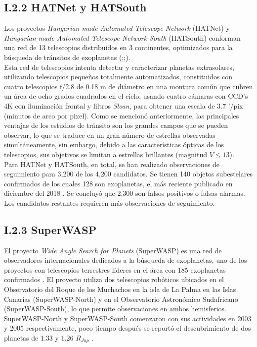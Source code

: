 \subsection*{I.2.2 HATNet y HATSouth}

Los proyectos \textit{Hungarian-made Automated Telescope Network} (HATNet) y \textit{Hungarian-made Automated Telescope Network-South} (HATSouth) conforman una red de 13 telescopios distribuidos en 3 continentes, optimizados para la búsqueda de tránsitos de exoplanetas (\citep{bakos2002system};\cite{bakos2004wide};\cite{bakos2013hatsouth}).\\

Esta red de telescopios intenta detectar y caracterizar planetas extrasolares, utilizando telescopios pequeños totalmente automatizados, constituidos con cuatro telescopios f/2.8 de 0.18 m de diámetro en una montura común que cubren un área de ocho grados cuadrados en el cielo, usando cuatro cámaras con CCD's 4K con iluminación frontal y filtros \textit{Sloan}, para obtener una escala de 3.7 '/pix (minutos de arco por pixel). Como se mencionó anteriormente, las principales ventajas de los estudios de tránsito son los grandes campos que se pueden observar, lo que se traduce en un gran número de estrellas observadas simultáneamente, sin embargo, debido a las características ópticas de los telescopios, sus objetivos se limitan a estrellas brillantes (magnitud $V \leq 13$).\\

Para HATNet y HATSouth, en total, se han realizado observaciones de seguimiento para 3,200 de los 4,200 candidatos. Se tienen 140 objetos subestelares confirmados de los cuales 128 son exoplanetas, el más reciente publicado en diciembre del 2018 \cite{bakos2018hats}. Se concluyó que 2,300 son falsos positivos o falsas alarmas. Los candidatos restantes requieren más observaciones de seguimiento.\\

\subsection*{I.2.3 SuperWASP}

El proyecto \textit{Wide Angle Search for Planets} (SuperWASP) es una red de observadores internacionales dedicados a la búsqueda de exoplanetas, uno de los proyectos con telescopios terrestres líderes en el área con 185 exoplanetas confirmados \citep{pollacco2006wasp}. El proyecto utiliza dos telescopios robóticos ubicados en el Observatorio del Roque de los Muchachos en la isla de La Palma en las Islas Canarias (SuperWASP-North) y en el Observatorio Astronómico Sudafricano (SuperWASP-South), lo que permite observaciones en ambos hemisferios. SuperWASP-North y SuperWASP-South comenzaron con sus actividades en 2003 y 2005 respectivamente, poco tiempo después se reportó el descubrimiento de dos planetas de 1.33 y 1.26 $R_{Jup}$ \citep{cameron2007wasp}.\\


